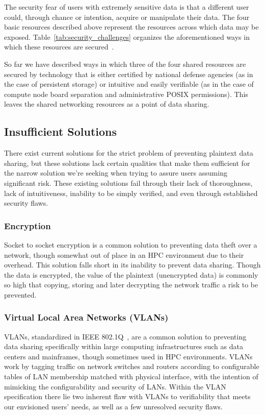 \documentclass[oneside,12pt]{memoir}
\begin{document}
The security fear of users with extremely sensitive data is that a different user could, through chance or intention, acquire or manipulate their data. The four basic resources described above represent the resources across which data may be exposed. Table~\ref{tab:security_challenges} organizes the aforementioned ways in which these resources are secured~\cite{buyya1999high}. 

So far we have described ways in which three of the four shared resources are secured by technology that is either certified by national defense agencies (as in the case of persistent storage) or intuitive and easily verifiable (as in the case of compute node board separation and administrative POSIX permissions). This leaves the shared networking resources as a point of data sharing. 

\subsection{Insufficient Solutions}
\label{sec:insufficient_solutions}
There exist current solutions for the strict problem of preventing plaintext data sharing, but these solutions lack certain qualities that make them sufficient for the narrow solution we're seeking when trying to assure users assuming significant risk. These existing solutions fail through their lack of thoroughness, lack of intuitiveness, inability to be simply verified, and even through established security flaws. 
\subsubsection{Encryption}
Socket to socket encryption is a common solution to preventing data theft over a network, though somewhat out of place in an HPC environment due to their overhead. This solution falls short in its inability to prevent data sharing. Though the data is encrypted, the value of the plaintext (unencrypted data) is commonly so high that copying, storing and later decrypting the network traffic a risk to be prevented.
\subsubsection{Virtual Local Area Networks (VLANs)}
VLANs, standardized in IEEE 802.1Q~\cite{ieee_vlan}, are a common solution to preventing data sharing specifically within large computing infrastructures such as data centers and mainframes, though sometimes used in HPC environments. VLANs work by tagging traffic on network switches and routers according to configurable tables of LAN membership matched with physical interface, with the intention of mimicking the configurability and security of LANs. Within the VLAN specification there lie two inherent flaw with VLANs to verifiability that meets our envisioned users' needs, as well as a few unresolved security flaws. 
\end{document}
